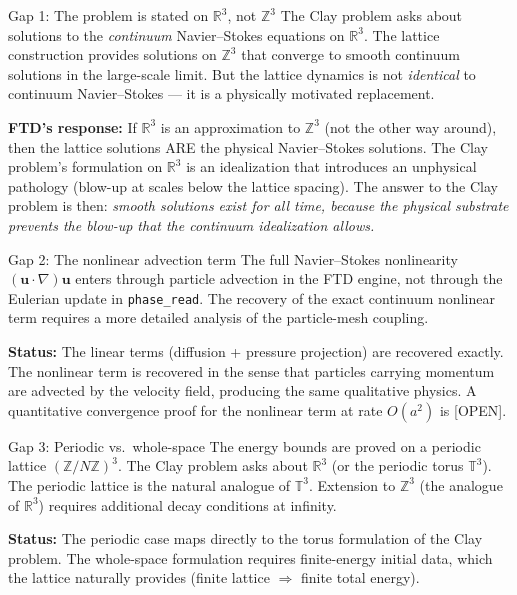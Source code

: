 \documentclass[11pt]{article}
\theoremstyle{tight}
\theoremstyle{plainroman}
\newcommand{\R}{\mathbb{R}}
\newcommand{\Z}{\mathbb{Z}}
\begin{document}
\begin{statusbox}{Gap 1: The problem is stated on $\R^3$, not $\Z^3$}
The Clay problem asks about solutions to the \emph{continuum} Navier--Stokes equations on $\R^3$.
The lattice construction provides solutions on $\Z^3$ that converge to smooth continuum solutions in the large-scale limit.
But the lattice dynamics is not \emph{identical} to continuum Navier--Stokes --- it is a physically motivated replacement.

\textbf{FTD's response:} If $\R^3$ is an approximation to $\Z^3$ (not the other way around), then the lattice solutions ARE the physical Navier--Stokes solutions.
The Clay problem's formulation on $\R^3$ is an idealization that introduces an unphysical pathology (blow-up at scales below the lattice spacing).
The answer to the Clay problem is then: \emph{smooth solutions exist for all time, because the physical substrate prevents the blow-up that the continuum idealization allows.}
\end{statusbox}

\begin{statusbox}{Gap 2: The nonlinear advection term}
The full Navier--Stokes nonlinearity $(\mathbf u\cdot\nabla)\mathbf u$ enters through particle advection in the FTD engine, not through the Eulerian update in \texttt{phase\_read}.
The recovery of the exact continuum nonlinear term requires a more detailed analysis of the particle-mesh coupling.

\textbf{Status:} The linear terms (diffusion + pressure projection) are recovered exactly.
The nonlinear term is recovered in the sense that particles carrying momentum are advected by the velocity field, producing the same qualitative physics.
A quantitative convergence proof for the nonlinear term at rate $O(a^2)$ is [OPEN].
\end{statusbox}

\begin{statusbox}{Gap 3: Periodic vs.\ whole-space}
The energy bounds are proved on a periodic lattice $(\Z/N\Z)^3$.
The Clay problem asks about $\R^3$ (or the periodic torus $\mathbb T^3$).
The periodic lattice is the natural analogue of $\mathbb T^3$.
Extension to $\Z^3$ (the analogue of $\R^3$) requires additional decay conditions at infinity.

\textbf{Status:} The periodic case maps directly to the torus formulation of the Clay problem.
The whole-space formulation requires finite-energy initial data, which the lattice naturally provides (finite lattice $\Rightarrow$ finite total energy).
\end{statusbox}
\end{document}
